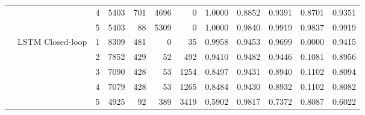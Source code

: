 \begin{table}[p]
{\begin{tabular}{|l|l|c|r|r|r|r|c|c|c|c|c|}
 &  & 4 & 5403 & 701 & 4696 & 0 & 1.0000 & 0.8852 & 0.9391 & 0.8701 & 0.9351 \\
 &  & 5 & 5403 & 88 & 5309 & 0 & 1.0000 & 0.9840 & 0.9919 & 0.9837 & 0.9919 \\
\cline{2-12}
 & \multirow{5}{*}{LSTM Closed-loop} & 1 & 8309 & 481 & 0 & 35 & 0.9958 & 0.9453 & 0.9699 & 0.0000 & 0.9415 \\
 &  & 2 & 7852 & 429 & 52 & 492 & 0.9410 & 0.9482 & 0.9446 & 0.1081 & 0.8956 \\
 &  & 3 & 7090 & 428 & 53 & 1254 & 0.8497 & 0.9431 & 0.8940 & 0.1102 & 0.8094 \\
 &  & 4 & 7079 & 428 & 53 & 1265 & 0.8484 & 0.9430 & 0.8932 & 0.1102 & 0.8082 \\
 &  & 5 & 4925 & 92 & 389 & 3419 & 0.5902 & 0.9817 & 0.7372 & 0.8087 & 0.6022 \\
\hline
\end{tabular}
}
\end{table}
